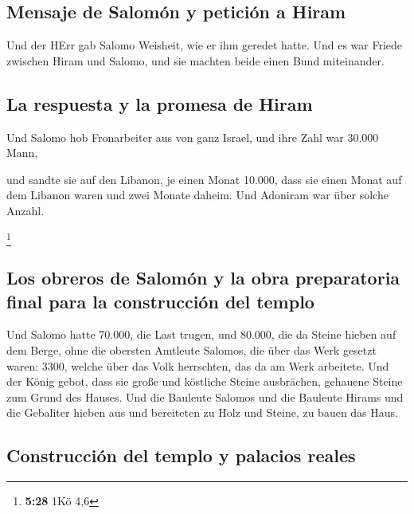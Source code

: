 \hypertarget{mensaje-de-salomuxf3n-y-peticiuxf3n-a-hiram}{%
\subsection{Mensaje de Salomón y petición a
Hiram}\label{mensaje-de-salomuxf3n-y-peticiuxf3n-a-hiram}}

 Und der HErr gab Salomo Weisheit, wie er ihm geredet
hatte. Und es war Friede zwischen Hiram und Salomo, und sie machten
beide einen Bund miteinander.

\hypertarget{la-respuesta-y-la-promesa-de-hiram}{%
\subsection{La respuesta y la promesa de
Hiram}\label{la-respuesta-y-la-promesa-de-hiram}}

 Und Salomo hob Fronarbeiter aus von ganz Israel, und
ihre Zahl war 30.000 Mann,

 und sandte sie auf den Libanon, je einen Monat 10.000,
dass sie einen Monat auf dem Libanon waren und zwei Monate daheim. Und
Adoniram war über solche Anzahl.

\footnote{\textbf{5:28} 1Kö 4,6}

\hypertarget{los-obreros-de-salomuxf3n-y-la-obra-preparatoria-final-para-la-construcciuxf3n-del-templo}{%
\subsection{Los obreros de Salomón y la obra preparatoria final para la
construcción del
templo}\label{los-obreros-de-salomuxf3n-y-la-obra-preparatoria-final-para-la-construcciuxf3n-del-templo}}

 Und Salomo hatte 70.000, die Last trugen, und 80.000,
die da Steine hieben auf dem Berge,  ohne die obersten
Amtleute Salomos, die über das Werk gesetzt waren: 3300, welche über das
Volk herrschten, das da am Werk arbeitete.  Und der König
gebot, dass sie große und köstliche Steine ausbrächen, gehauene Steine
zum Grund des Hauses.  Und die Bauleute Salomos und die
Bauleute Hirams und die Gebaliter hieben aus und bereiteten zu Holz und
Steine, zu bauen das Haus.

\hypertarget{construcciuxf3n-del-templo-y-palacios-reales}{%
\subsection{Construcción del templo y palacios
reales}\label{construcciuxf3n-del-templo-y-palacios-reales}}

